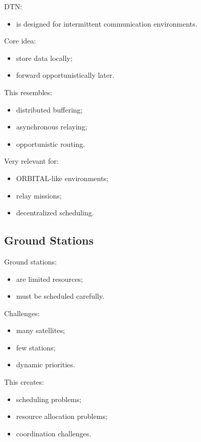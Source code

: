 \documentclass[10pt,a4paper,twocolumn]{article}
\begin{document}
DTN:
\begin{itemize}
    \item is designed for intermittent communication environments.
\end{itemize}

Core idea:
\begin{itemize}
    \item store data locally;
    \item forward opportunistically later.
\end{itemize}

This resembles:
\begin{itemize}
    \item distributed buffering;
    \item asynchronous relaying;
    \item opportunistic routing.
\end{itemize}

Very relevant for:
\begin{itemize}
    \item ORBITAL-like environments;
    \item relay missions;
    \item decentralized scheduling.
\end{itemize}


\subsection{Ground Stations}

Ground stations:
\begin{itemize}
    \item are limited resources;
    \item must be scheduled carefully.
\end{itemize}

Challenges:
\begin{itemize}
    \item many satellites;
    \item few stations;
    \item dynamic priorities.
\end{itemize}

This creates:
\begin{itemize}
    \item scheduling problems;
    \item resource allocation problems;
    \item coordination challenges.
\end{itemize}
\end{document}
